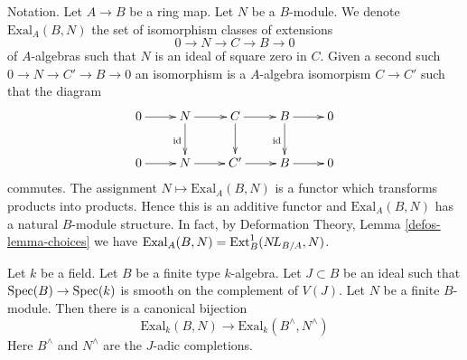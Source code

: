 \noindent
Notation. Let $A \to B$ be a ring map. Let $N$ be a $B$-module.
We denote $\text{Exal}_A(B, N)$ the set of isomorphism classes
of extensions
$$
0 \to N \to C \to B \to 0
$$
of $A$-algebras such that $N$ is an ideal of square zero in $C$.
Given a second such $0 \to N \to C' \to B \to 0$ an isomorphism
is a $A$-algebra isomorpism $C \to C'$ such that the diagram
$$
\xymatrix{
0 \ar[r] &
N \ar[r] \ar[d]_{\text{id}} &
C \ar[r] \ar[d] &
B \ar[r] \ar[d]_{\text{id}} & 0 \\
0 \ar[r] &
N \ar[r] &
C' \ar[r] &
B \ar[r] & 0
}
$$
commutes. The assignment $N \mapsto \text{Exal}_A(B, N)$
is a functor which transforms products into products.
Hence this is an additive functor and $\text{Exal}_A(B, N)$
has a natural $B$-module structure. In fact, by
Deformation Theory, Lemma \ref{defos-lemma-choices}
we have $\text{Exal}_A(B, N) = \text{Ext}^1_B(\mathop{N\!L}\nolimits_{B/A}, N)$.

\begin{lemma}
\label{lemma-first-order-completion}
Let $k$ be a field. Let $B$ be a finite type $k$-algebra.
Let $J \subset B$ be an ideal such that
$\mathop{\mathrm{Spec}}(B) \to \mathop{\mathrm{Spec}}(k)$ is smooth on the complement of $V(J)$.
Let $N$ be a finite $B$-module.
Then there is a canonical bijection
$$
\text{Exal}_k(B, N) \to \text{Exal}_k(B^\wedge, N^\wedge)
$$
Here $B^\wedge$ and $N^\wedge$ are the $J$-adic completions.
\end{lemma}

